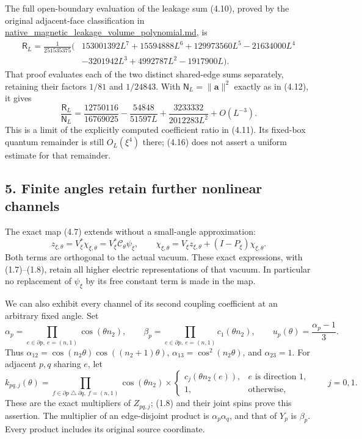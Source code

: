 \documentclass[
  11pt,
]{article}
\begin{document}
The full open-boundary evaluation of the leakage sum (4.10), proved by
the original adjacent-face classification in
\url{native_magnetic_leakage_volume_polynomial.md}, is \[
\boxed{\begin{split}
 \mathsf R_L=\frac1{251535375}\bigl(&153001392L^7+15594888L^6
 +129973560L^5-21634000L^4\\
 &-3201942L^3+4992787L^2-1917900L\bigr).
\end{split}}
\tag{4.15}
\] That proof evaluates each of the two distinct shared-edge sums
separately, retaining their factors \(1/81\) and \(1/24843\). With
\(\mathsf N_L=\|\mathbf a\|^2\) exactly as in (4.12), it gives \[
 \frac{\mathsf R_L}{\mathsf N_L}
 =\frac{12750116}{16769025}-\frac{54848}{51597L}
       +\frac{3233332}{2012283L^2}+O(L^{-3}).
\tag{4.16}
\] This is a limit of the explicitly computed coefficient ratio in
(4.11). Its fixed-box quantum remainder is still \(O_L(\xi^4)\) there;
(4.16) does not assert a uniform estimate for that remainder.

\subsection{5. Finite angles retain further nonlinear
channels}\label{magnetic-part-9-finite-angles-retain-further-nonlinear-channels}

The exact map (4.7) extends without a small-angle approximation: \[
 z_{\xi,\theta}=V_\xi^*\chi_{\xi,\theta}
                =V_\xi^*\mathcal C_\theta\psi_\xi,
 \qquad
 \chi_{\xi,\theta}=V_\xi z_{\xi,\theta}
                     +(I-P_\xi)\chi_{\xi,\theta}.
\tag{5.1}
\] Both terms are orthogonal to the actual vacuum. These exact
expressions, with (1.7)--(1.8), retain all higher electric
representations of that vacuum. In particular no replacement of
\(\psi_\xi\) by its free constant term is made in the map.

We can also exhibit every channel of its second coupling coefficient at
an arbitrary fixed angle. Set \[
 \alpha_p=\prod_{e\in\partial p,\ e=(n,1)}\cos(\theta n_2),
 \qquad \beta_p=\prod_{e\in\partial p,\ e=(n,1)}c_1(\theta n_2),
 \qquad u_p(\theta)=\frac{\alpha_p-1}{3}.
\tag{5.2}
\] Thus \(\alpha_{12}=\cos(n_2\theta)\cos((n_2+1)\theta)\),
\(\alpha_{13}=\cos^2(n_2\theta)\), and \(\alpha_{23}=1\). For adjacent
\(p,q\) sharing \(e\), let \[
 k_{pq,j}(\theta)=
 \prod_{f\in\partial p\mathbin\triangle\partial q,\ f=(n,1)}
                     \cos(\theta n_2)
 \times
 \begin{cases}c_j(\theta n_2(e)),&e\text{ is direction 1},\\1,&\text{otherwise},\end{cases}
 \qquad j=0,1.
\tag{5.3}
\] These are the exact multipliers of \(Z_{pq,j}\); (1.8) and their
joint spins prove this assertion. The multiplier of an edge-disjoint
product is \(\alpha_p\alpha_q\), and that of \(Y_p\) is \(\beta_p\).
Every product includes its original source coordinate.
\end{document}
